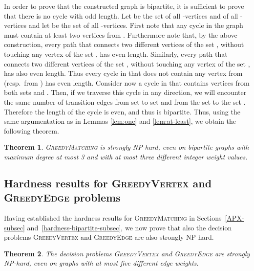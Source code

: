 \documentclass[a4paper,11pt]{article}
\newtheorem{theorem}{Theorem}
\newcommand{\greedy}{\textsc{GreedyMatching}\xspace}
\newcommand{\greedyv}{\textsc{GreedyVertex}\xspace}
\newcommand{\greedye}{\textsc{GreedyEdge}\xspace}
\begin{document}
In order to prove that the constructed graph is bipartite, it is sufficient
to prove that there is no cycle with odd length. Let  be the set of all -vertices and of all -vertices and let  be the set
of all -vertices. First note that any cycle in the graph  must
contain at least two vertices from . Furthermore note that,
by the above construction, every path that connects two different vertices
of the set , without touching any vertex of the set , has even
length. Similarly, every path that connects two different vertices of the
set , without touching any vertex of the set , has also even
length. Thus every cycle in  that does not contain any vertex from  (resp.~from ) has even length. Consider now a cycle in  that
contains vertices from both sets  and . Then, if we traverse
this cycle in any direction, we will encounter the same number of transition
edges from set  to set  and from the set  to the set . Therefore the length of the cycle is even, and thus  is bipartite.
Thus, using the same argumentation as in Lemmas \ref{lem:one} and \ref {lem:at-least}, we obtain the following theorem.

\begin{theorem}
\label{thm:bip-hard} \greedy is strongly NP-hard,
even on \emph{bipartite} graphs with maximum degree at most 3 and with at
most three different integer weight values.
\end{theorem}




\subsection{Hardness results for \greedyv and \textsc{GreedyEdge}\xspace problems\label{hardness-additional-subsec}}

Having established the hardness results for \greedy in Sections~\ref{APX-subsec} and~\ref{hardness-bipartite-subsec}, we now
prove that also the decision problems \greedyv and 
\greedye are also strongly NP-hard.

\begin{theorem}
\label{thm:twohard} The decision problems \greedyv and 
\greedye are strongly NP-hard, even on
graphs with at most five different edge weights.
\end{theorem}
\end{document}
